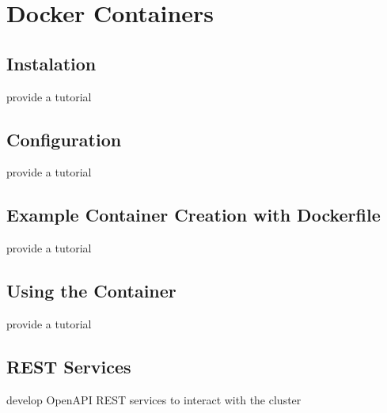 \chapter{Docker Containers}

\section{Instalation}

\begin{}
provide a tutorial 
\end{}

\section{Configuration}

\begin{}
provide a tutorial 
\end{}

\section{Example Container Creation with Dockerfile}

\begin{}
provide a tutorial 
\end{}

\section{Using the Container}

\begin{}
provide a tutorial 
\end{}

\section{REST Services}

\begin{}
develop OpenAPI REST services to interact with the cluster
\end{}

